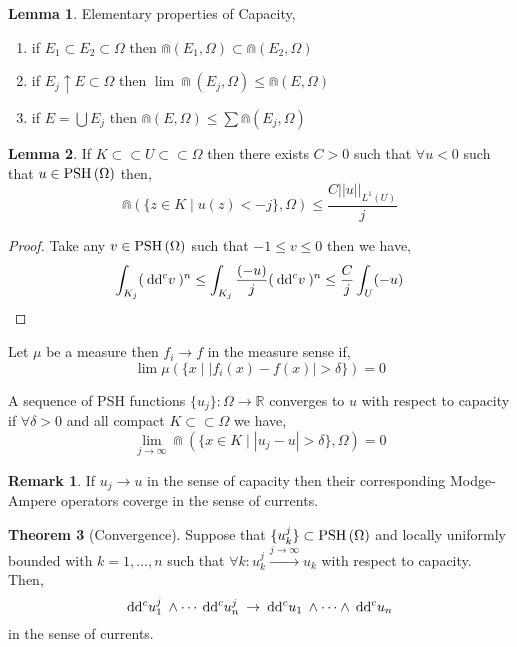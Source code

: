 \documentclass[12pt]{extarticle}
\newcommand{\R}{\mathbb{R}}
\renewcommand{\d}[1]{\: \mathrm{d}#1 \:}
\theoremstyle{definition}
\newtheorem{theorem}{Theorem}[section]
\newtheorem{lemma}[theorem]{Lemma}
\newtheorem{remark}{Remark}
\newenvironment{definition}[1][Definition:]{\begin{trivlist}
\item[\hskip \labelsep {\bfseries #1}]}{\end{trivlist}}
\begin{document}
\begin{lemma}
Elementary properties of Capacity,
\begin{enumerate}
\item if $E_1 \subset E_2 \subset \Omega$ then $\Cap(E_1, \Omega) \subset \Cap(E_2, \Omega)$

\item if $E_j \uparrow E \subset \Omega$ then $\lim \Cap(E_j, \Omega) \le \Cap(E, \Omega)$

\item if $E = \bigcup E_j$ then $\Cap(E, \Omega) \le \sum \Cap(E_j, \Omega)$
\end{enumerate}
\end{lemma}

\begin{lemma}
If $K \subset \subset U \subset \subset \Omega$ then there exists $C > 0$ such that $\forall u < 0$ such that $u \in \mathrm{PSH}\left( \Omega \right)$ then,
\[ \Cap\left( \{ z \in K \mid u(z) < -j \}, \Omega \right) \le \frac{C ||u||_{L^1(U)}}{j} \]
\end{lemma}

\begin{proof}
Take any $v \in \mathrm{PSH}\left( \Omega \right)$ such that $-1 \le v \le 0$ then we have,
\[ \int_{K_j} (\d{\dc{v}})^n \le \int_{K_j} \frac{(-u)}{j} (\d{\dc{v}})^n  \le \frac{C}{j} \int_U (-u) \]
\end{proof}

\begin{definition}
Let $\mu$ be a measure then $f_i \to f$ in the measure sense if,
\[ \lim \mu(\{ x \mid |f_i(x) - f(x)| > \delta \}) = 0 \]
\end{definition}

\begin{definition}
A sequence of PSH functions $\{u_j\} : \Omega \to \R$ converges to $u$ with respect to capacity if $\forall \delta > 0$ and all compact $K \subset \subset \Omega$ we have,
\[ \lim_{j \to \infty} \Cap( \{ x \in K \mid |u_j - u| > \delta \}, \Omega) = 0 \]
\end{definition}

\begin{remark}
If $u_j \to u$ in the sense of capacity then their corresponding Modge-Ampere operators coverge in the sense of currents. 
\end{remark}

\begin{theorem}[Convergence]
Suppose that $\{ u^j_k \} \subset \mathrm{PSH}\left( \Omega \right)$ and locally uniformly bounded with $k = 1, \dots, n$ such that $\forall k : u^j_k \xrightarrow{j \to \infty} u_k$ with respect to capacity. Then,
\[ \d{\dc{u_1^j}} \wedge \cdots \d{\dc{u_n^j}} \to \d{\dc{u_1}} \wedge \cdots \wedge \d{\dc{u_n}} \]
in the sense of currents. 
\end{theorem}
\end{document}
